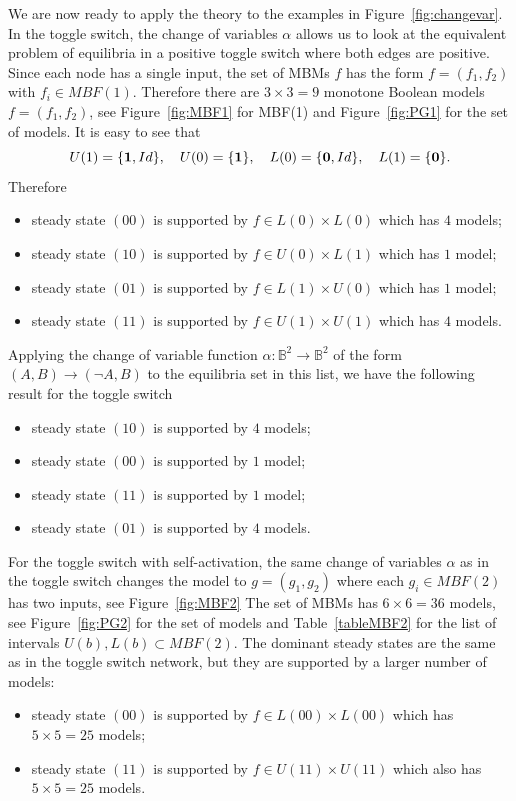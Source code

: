 \documentclass[10pt,letterpaper]{article}
\newcommand{\bbB}{\mathbb{B}}
\newcommand{\bzero}{{\bf 0}}
\newcommand{\bone}{{\bf 1}}
\begin{document}
We are now ready to apply the theory to the examples in Figure~\ref{fig:changevar}.
In the toggle switch, the change of variables $\alpha$ allows us to look at the equivalent problem of equilibria in a positive toggle switch where both edges are positive. Since each node has a single input, the set of MBMs $f$ has the form $f=(f_1,f_2)$ with $f_i \in MBF(1)$. Therefore there are  $3\times 3 = 9$ monotone Boolean models $f=(f_1,f_2)$, see Figure~\ref{fig:MBF1} for MBF(1) and Figure~\ref{fig:PG1} for the set of models.
It is easy to see that
\[ U(1) = \{ \bone, Id\},\quad U(0)=\{ \bone\}, \quad L(0) = \{ \bzero, Id\},\quad L(1)=\{ \bzero\}.\]
Therefore
\begin{itemize}
\item steady state $(00)$ is supported by $f \in L(0)\times L(0)$ which has $4$ models;
\item steady state $(10)$ is supported by $f \in U(0)\times L(1)$ which has $1$ model;
\item steady state $(01)$ is supported by $f \in L(1)\times U(0)$ which has $1$ model;
\item steady state $(11)$ is supported by $f \in U(1)\times U(1)$ which has $4$ models.
\end{itemize}
Applying the change of variable function $\alpha:\bbB^2\to \bbB^2$ of the form $(A,B) \to (\neg A, B)$ to the equilibria set in this list, we have the following result for the toggle switch
\begin{itemize}
\item steady state $(10)$ is supported by $4$ models;
\item steady state $(00)$ is supported by $1$ model;
\item steady state $(11)$ is supported by $1$ model;
\item steady state $(01)$ is supported by $4$ models.
\end{itemize}

For the toggle switch with self-activation, the same change of variables $\alpha$ as in the toggle switch changes the model to $g = (g_1, g_2)$ where each $g_i \in MBF(2)$ has two inputs, see Figure~\ref{fig:MBF2} The set of MBMs has  $6 \times 6 = 36$ models, see Figure~\ref{fig:PG2} for the set of models and Table~\ref{tableMBF2} for the list of intervals $U(b), L(b) \subset MBF(2)$. The dominant steady states are the same as in the toggle switch network, but they are supported by a larger number of models:
\begin{itemize}
\item steady state $(00)$ is supported by $f \in L(00)\times L(00)$ which has $5 \times 5 = 25$ models;
\item steady state $(11)$ is supported by $f \in U(11)\times U(11)$ which also has $5 \times 5 = 25$ models.
\end{itemize}
\end{document}
